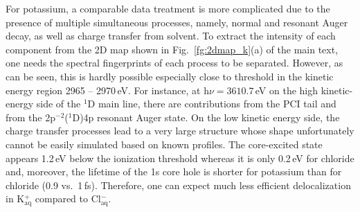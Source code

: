 \documentclass[journal=jpclcd,manuscript=letter]{achemso}
\begin{document}
For potassium, a comparable data treatment is more complicated due to the presence of multiple simultaneous processes, namely, normal and resonant Auger decay, as well as charge transfer from solvent. To extract the intensity of each component from the 2D map shown in Fig.\ \ref{fg:2dmap_k}(a) of the main text, one needs the spectral fingerprints of each process to be separated. However, as can be seen, this is hardly possible especially close to threshold in the kinetic energy region 2965 -- 2970\,eV. For instance, at h$\nu = 3610.7$\,eV on the high kinetic-energy side of the $^1$D main line, there are contributions from the PCI tail and from the 2p$^{-2}$($^1$D)4p resonant Auger state. On the low kinetic energy side, the charge transfer processes lead to a very large structure whose shape unfortunately cannot be easily simulated based on known profiles. The core-excited state appears 1.2\,eV below the ionization threshold whereas it is only 0.2\,eV for chloride and, moreover, the lifetime of the 1s core hole is shorter for potassium than for chloride (0.9 vs.\ 1\,fs). Therefore, one can expect much less efficient delocalization in K$^{+}_{\text{aq}}$ compared to Cl$^{-}_{\text{aq}}$.




\end{document}
